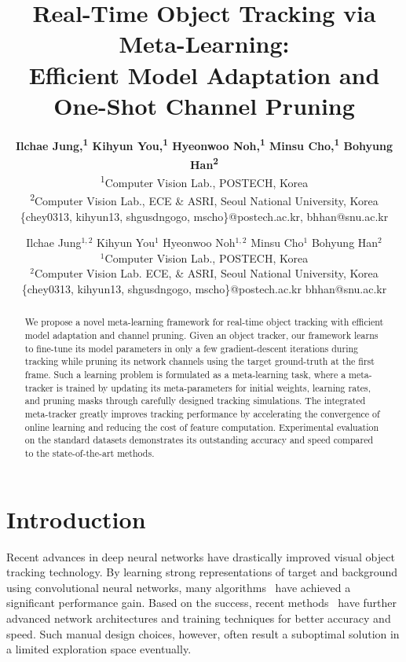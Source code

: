 \documentclass[letterpaper]{article} %
\title{Real-Time Object Tracking via Meta-Learning: \\ Efficient Model Adaptation and One-Shot Channel Pruning}
\author{
\Large \textbf{Ilchae Jung,\textsuperscript{\rm 1} Kihyun You,\textsuperscript{\rm 1} Hyeonwoo Noh,\textsuperscript{\rm 1} Minsu Cho,\textsuperscript{\rm 1} Bohyung Han\textsuperscript{\rm 2} }\\
\textsuperscript{\rm 1}Computer Vision Lab., POSTECH, Korea  \\
\textsuperscript{\rm 2}Computer Vision Lab., ECE \& ASRI, Seoul National University, Korea\\
\{chey0313, kihyun13, shgusdngogo, mscho\}@postech.ac.kr,  bhhan@snu.ac.kr
}
\author{Ilchae Jung$^{1,2}$ \hspace{0.5cm} Kihyun You$^1$ \hspace{0.5cm} Hyeonwoo Noh$^{1,2}$ \hspace{0.5cm} Minsu Cho$^1$ \hspace{0.5cm} Bohyung Han$^2$ \\
	$^1$Computer Vision Lab., POSTECH, Korea \\
	$^2$Computer Vision Lab. ECE, \& ASRI, Seoul National University, Korea   \\
	 \null \{chey0313, kihyun13, shgusdngogo, mscho\}@postech.ac.kr \hspace{1cm}  bhhan@snu.ac.kr
  \null
}
\begin{document}
\maketitle
\begin{abstract}

      We propose a novel meta-learning framework for real-time object tracking with efficient model adaptation and channel pruning.
Given an object tracker, our framework learns to fine-tune its model parameters in only a few gradient-descent iterations during tracking while pruning its network channels using the target ground-truth at the first frame.
Such a learning problem is formulated as a meta-learning task, where a meta-tracker is trained by updating its meta-parameters for initial weights, learning rates, and pruning masks through carefully designed tracking simulations.
The integrated meta-tracker greatly improves tracking performance by accelerating the convergence of online learning and reducing the cost of feature computation.
Experimental evaluation on the standard datasets demonstrates its outstanding accuracy and speed compared to the state-of-the-art methods.


\end{abstract}


\section{Introduction}
\label{sec:introduction}
Recent advances in deep neural networks have drastically improved visual object tracking technology.
By learning strong representations of target and background using convolutional neural networks, many algorithms~\cite{nam2016learningmulti,nam2016modeling,han2017branchout,martin2016beyond,martin2017eco} have achieved a significant performance gain.
Based on the success, recent methods~\cite{danelljan2019atom,li2019siamrpn++,huang2017learning,fan2017parallel,zheng2018distractor,jung2018realtime} have further advanced network architectures and training techniques for better accuracy and speed.
Such manual design choices, however, often result a suboptimal solution in a limited exploration space eventually.
\end{document}
